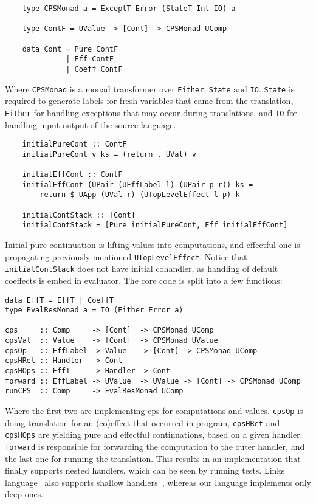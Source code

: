 \documentclass[declaration,shortabstract]{iithesis}
\theoremstyle{definition} \newtheorem{definition}{Definition}[chapter]
\theoremstyle{remark} \newtheorem{remark}[definition]{Observation}
\theoremstyle{plain} \newtheorem{theorem}[definition]{Theorem}
\theoremstyle{plain} \newtheorem{lemma}[definition]{Lemma}
\begin{document}
\begin{verbatim}
    type CPSMonad a = ExceptT Error (StateT Int IO) a

    type ContF = UValue -> [Cont] -> CPSMonad UComp

    data Cont = Pure ContF
              | Eff ContF
              | Coeff ContF
\end{verbatim}

    \noindent
    Where \verb!CPSMonad! is a monad transformer over \verb!Either!, \verb!State!
    and \verb!IO!. \verb!State! is required to generate labels for fresh variables
    that came from the translation, \verb!Either! for handling exceptions that
    may occur during translations, and \verb!IO! for handling input output of the
    source language.

\begin{verbatim}
    initialPureCont :: ContF
    initialPureCont v ks = (return . UVal) v

    initialEffCont :: ContF
    initialEffCont (UPair (UEffLabel l) (UPair p r)) ks =
        return $ UApp (UVal r) (UTopLevelEffect l p) k

    initialContStack :: [Cont]
    initialContStack = [Pure initialPureCont, Eff initialEffCont]
\end{verbatim}

    \noindent
    Initial pure continuation is lifting values into computations,
    and effectful one is propagating previously mentioned \verb!UTopLevelEffect!.
    Notice that \verb!initialContStack! does not have initial cohandler,
    as handling of default coeffects is embed in evaluator. The core code is
    split into a few functions:

\begin{verbatim}
data EffT = EffT | CoeffT
type EvalResMonad a = IO (Either Error a)

cps     :: Comp     -> [Cont]  -> CPSMonad UComp
cpsVal  :: Value    -> [Cont]  -> CPSMonad UValue
cpsOp   :: EffLabel -> Value   -> [Cont] -> CPSMonad UComp
cpsHRet :: Handler  -> Cont
cpsHOps :: EffT     -> Handler -> Cont
forward :: EffLabel -> UValue  -> UValue -> [Cont] -> CPSMonad UComp
runCPS  :: Comp     -> EvalResMonad UComp
\end{verbatim}

    \noindent
    Where the first two are implementing cps for computations and values.
    \verb!cpsOp! is doing translation for an (co)effect that occurred in program,
    \verb!cpsHRet! and \verb!cpsHOps! are yielding pure and effectful continuations,
    based on a given handler. \verb!forward! is responsible for forwarding the
    computation to the outer handler, and the last one for running the
    translation. This results in an
    implementation that finally supports nested handlers, which can be seen by
    running tests. Links language~\cite{handlers-cps-journal} also supports
    shallow handlers~\cite{shallow-handlers}, whereas our language implements
    only deep ones.
\end{document}
